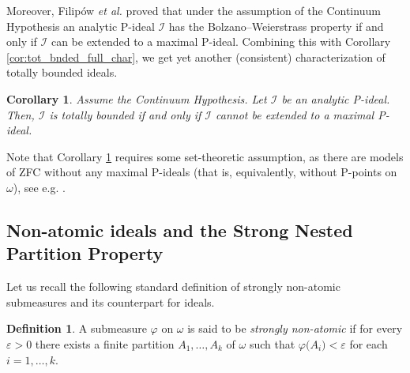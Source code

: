 \documentclass[a4paper,11pt,fleqn]{amsart}
\newtheorem{corollary}[theorem]{Corollary}
\theoremstyle{definition}
\newtheorem{definition}[theorem]{Definition}
\theoremstyle{remark}
\numberwithin{equation}{section}
\newcommand{\eps}{\varepsilon}
\newcommand{\F}{\mathbb{F}}
\newcommand{\iI}{\mathcal{I}}
\begin{document}
%

Moreover, Filip\'{o}w \textit{et al.} \cite[Theorem 4.3]{FMRS07} proved that under the assumption of the Continuum Hypothesis an analytic P-ideal $\iI$ has the Bolzano--Weierstrass property if and only if $\iI$ can be extended to a maximal P-ideal. Combining this with Corollary \ref{cor:tot_bnded_full_char}, we get yet another (consistent) characterization of totally bounded ideals.

\begin{corollary}\label{cor:ch_tot_bnded_char}
Assume the Continuum Hypothesis. Let $\iI$ be an analytic P-ideal. Then, $\iI$ is totally bounded if and only if $\iI$ cannot be extended to a maximal P-ideal.
\end{corollary}

Note that Corollary \ref{cor:ch_tot_bnded_char} requires some set-theoretic assumption, as there are models of \textsf{ZFC} without any maximal P-ideals (that is, equivalently, without P-points on $\omega$), see e.g. \cite{Wim82}.


\subsection{Non-atomic ideals and the Strong Nested Partition Property}

Let us recall the following standard definition of strongly non-atomic submeasures and its counterpart for ideals.

\begin{definition}
A submeasure $\varphi$ on $\omega$ is said to be \textit{strongly non-atomic} if for every
$\eps > 0$ there exists a finite partition $A_1,\ldots, A_k$ of $\omega$ such that $\varphi\big(A_i\big)<\eps$ for each $i=1,\ldots,k$.
\end{definition}
\end{document}
